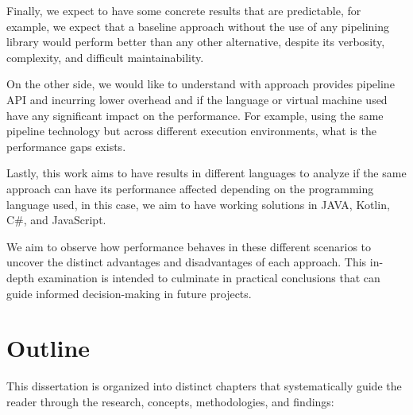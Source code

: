 Finally, we expect to have some concrete results that are predictable, for example, we expect that a baseline approach without the use of any pipelining library would perform better than any other alternative, despite its verbosity, complexity, and difficult maintainability.

On the other side, we would like to understand with approach provides pipeline API and incurring lower overhead and if the language or virtual machine used have any significant impact on the performance. For example, using the same pipeline technology but across different execution environments, what is the performance gaps exists. 

Lastly, this work aims to have results in different languages to analyze if the same approach can have its performance affected depending on the programming language used, in this case, we aim to have working solutions in JAVA, Kotlin, C\#, and JavaScript. 

We aim to observe how performance behaves in these different scenarios to uncover the distinct advantages and disadvantages of each approach. This in-depth examination is intended to culminate in practical conclusions that can guide informed decision-making in future projects.

\section{Outline}
\label{sec:outline}

This dissertation is organized into distinct chapters that systematically guide the reader through the research, concepts, methodologies, and findings:

